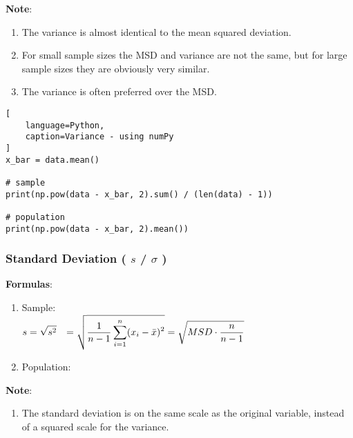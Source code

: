 \vspace{0.2cm}
\textbf{Note}:
\begin{enumerate}
    \item The variance is almost identical to the mean squared deviation. \hfill \cite{statistics/book/Statistics-for-Data-Scientists/Maurits-Kaptein}

    \item For small sample sizes the MSD and variance are not the same, but for large sample sizes they are obviously very similar. \hfill \cite{statistics/book/Statistics-for-Data-Scientists/Maurits-Kaptein}

    \item The variance is often preferred over the MSD. \hfill \cite{statistics/book/Statistics-for-Data-Scientists/Maurits-Kaptein}
\end{enumerate}


\begin{lstlisting}[
    language=Python,
    caption=Variance - using numPy
]
x_bar = data.mean()

# sample
print(np.pow(data - x_bar, 2).sum() / (len(data) - 1))

# population
print(np.pow(data - x_bar, 2).mean())
\end{lstlisting}


\subsubsection{Standard Deviation ( $s$ / $\sigma$ ) \cite{statistics/book/Statistics-for-Data-Scientists/Maurits-Kaptein}} \label{Data/Describing Data/Central Tendency/Standard Deviation}

\textbf{Formulas}:
\begin{enumerate}
    \item Sample:
    \label{Data/Describing Data/Central Tendency/Standard Deviation/Sample} \\
        $
            \begin{aligned}
                s
                &=\sqrt{s^2}
                &= \sqrt{\dfrac{1}{n-1} \displaystyle\sum_{i=1}^{n} (x_i - \bar{x})^2}
                &= \sqrt{MSD \cdot \dfrac{n}{n-1}}
            \end{aligned}
        $

    \item Population:
\end{enumerate}


\vspace{0.2cm}
\textbf{Note}:
\begin{enumerate}
    \item The standard deviation is on the same scale as the original variable, instead of a squared scale for the variance. \hfill \cite{statistics/book/Statistics-for-Data-Scientists/Maurits-Kaptein}


\end{enumerate}


